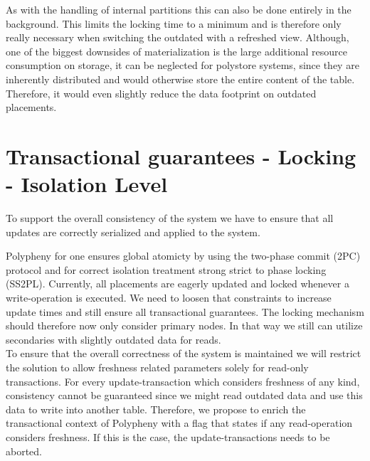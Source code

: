 As with the handling of internal partitions this can also be done entirely in the background. This limits the locking time to a minimum and is therefore only really 
necessary when switching the outdated with a refreshed view.
Although, one of the biggest downsides of materialization is the large additional resource consumption on storage, it can be neglected for polystore systems, since they are
inherently distributed and would otherwise store the entire content of the table. Therefore, it would even slightly reduce the data footprint on outdated placements.









\section{Transactional guarantees - Locking - Isolation Level}
\label{consistency}

To support the overall consistency of the system we have to ensure that all updates are correctly serialized and applied to the system.

Polypheny for one ensures global atomicty by using the two-phase commit (2PC) protocol and for correct isolation treatment
strong strict to phase locking (SS2PL). Currently, all placements are eagerly updated and locked whenever a write-operation is executed.
We need to loosen that constraints to increase update times and still ensure all transactional guarantees. The locking mechanism should therefore 
now only consider primary nodes. In that way we still can utilize secondaries with slightly outdated data for reads.\\

To ensure that the overall correctness of the system is maintained we will restrict the solution to allow freshness related parameters solely
for read-only transactions. For every update-transaction which considers freshness of any kind, consistency cannot be guaranteed since we might read outdated data
and use this data to write into another table. Therefore, we propose to enrich  the transactional context of Polypheny with a flag that states if any read-operation 
considers freshness. If this is the case, the update-transactions needs to be aborted.\\


